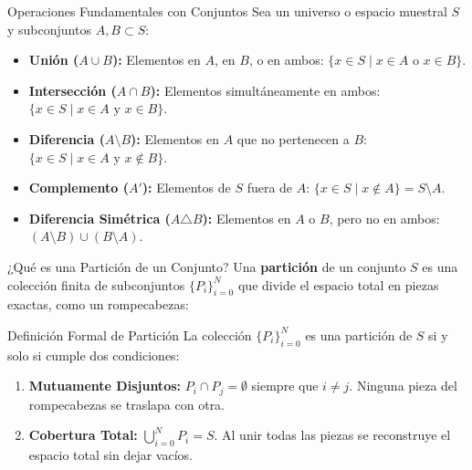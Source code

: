\documentclass[10pt,aspectratio=169]{beamer}
\begin{document}
\begin{frame}{Operaciones Fundamentales con Conjuntos}
  Sea un universo o espacio muestral $S$ y subconjuntos $A, B \subset S$:
  
  \vspace{0.2em}
  \begin{itemize}
    \item \textbf{Unión ($A \cup B$):} Elementos en $A$, en $B$, o en ambos: $\{x \in S \mid x \in A \text{ o } x \in B\}$. \pause
    \item \textbf{Intersección ($A \cap B$):} Elementos simultáneamente en ambos: $\{x \in S \mid x \in A \text{ y } x \in B\}$. \pause
    \item \textbf{Diferencia ($A \setminus B$):} Elementos en $A$ que no pertenecen a $B$: $\{x \in S \mid x \in A \text{ y } x \notin B\}$. \pause
    \item \textbf{Complemento ($A'$):} Elementos de $S$ fuera de $A$: $\{x \in S \mid x \notin A\} = S \setminus A$. \pause
    \item \textbf{Diferencia Simétrica ($A \triangle B$):} Elementos en $A$ o $B$, pero no en ambos: $(A \setminus B) \cup (B \setminus A)$.
  \end{itemize}
\end{frame}

\begin{frame}{¿Qué es una Partición de un Conjunto?}
  Una \textbf{partición} de un conjunto $S$ es una colección finita de subconjuntos $\{P_i\}_{i=0}^{N}$ que divide el espacio total en piezas exactas, como un rompecabezas:
  
  \vspace{0.4em}
  \begin{block}{Definición Formal de Partición}
    La colección $\{P_i\}_{i=0}^{N}$ es una partición de $S$ si y solo si cumple dos condiciones:
    \begin{enumerate}
      \item \textbf{Mutuamente Disjuntos:} $P_i \cap P_j = \emptyset$ siempre que $i \neq j$. Ninguna pieza del rompecabezas se traslapa con otra. \pause
      \item \textbf{Cobertura Total:} $\bigcup_{i=0}^{N} P_i = S$. Al unir todas las piezas se reconstruye el espacio total sin dejar vacíos.
    \end{enumerate}
  \end{block}
\end{frame}
\end{document}
